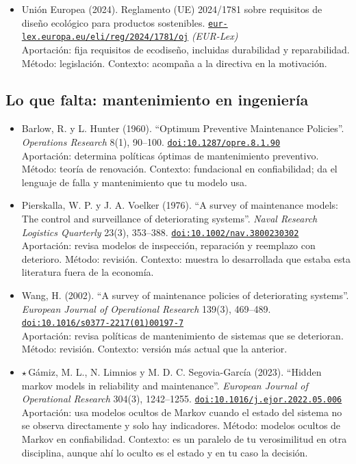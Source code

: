 \documentclass[11pt]{article}
\begin{document}
\begin{itemize}
Aportación: norma europea que promueve la reparación de bienes. Método: legislación. Contexto: motiva tu contrafactual de precio de reparación; cítala en la introducción.
\item Unión Europea (2024). Reglamento (UE) 2024/1781 sobre requisitos de diseño ecológico para productos sostenibles. \href{https://eur-lex.europa.eu/eli/reg/2024/1781/oj}{\texttt{eur-lex.europa.eu/eli/reg/2024/1781/oj}} \textit{(EUR-Lex)}\\
Aportación: fija requisitos de ecodiseño, incluidas durabilidad y reparabilidad. Método: legislación. Contexto: acompaña a la directiva en la motivación.
\end{itemize}

\subsection*{Lo que falta: mantenimiento en ingeniería}
\begin{itemize}
\item Barlow, R. y L. Hunter (1960). ``Optimum Preventive Maintenance Policies''. \textit{Operations Research} 8(1), 90--100. \href{https://doi.org/10.1287/opre.8.1.90}{\texttt{doi:10.1287/opre.8.1.90}}\\
Aportación: determina políticas óptimas de mantenimiento preventivo. Método: teoría de renovación. Contexto: fundacional en confiabilidad; da el lenguaje de falla y mantenimiento que tu modelo usa.
\item Pierskalla, W. P. y J. A. Voelker (1976). ``A survey of maintenance models: The control and surveillance of deteriorating systems''. \textit{Naval Research Logistics Quarterly} 23(3), 353--388. \href{https://doi.org/10.1002/nav.3800230302}{\texttt{doi:10.1002/nav.3800230302}}\\
Aportación: revisa modelos de inspección, reparación y reemplazo con deterioro. Método: revisión. Contexto: muestra lo desarrollada que estaba esta literatura fuera de la economía.
\item Wang, H. (2002). ``A survey of maintenance policies of deteriorating systems''. \textit{European Journal of Operational Research} 139(3), 469--489. \href{https://doi.org/10.1016/s0377-2217(01)00197-7}{\texttt{doi:10.1016/s0377-2217(01)00197-7}}\\
Aportación: revisa políticas de mantenimiento de sistemas que se deterioran. Método: revisión. Contexto: versión más actual que la anterior.
\item $\star$\,Gámiz, M. L., N. Limnios y M. D. C. Segovia-García (2023). ``Hidden markov models in reliability and maintenance''. \textit{European Journal of Operational Research} 304(3), 1242--1255. \href{https://doi.org/10.1016/j.ejor.2022.05.006}{\texttt{doi:10.1016/j.ejor.2022.05.006}}\\
Aportación: usa modelos ocultos de Markov cuando el estado del sistema no se observa directamente y solo hay indicadores. Método: modelos ocultos de Markov en confiabilidad. Contexto: es un paralelo de tu verosimilitud en otra disciplina, aunque ahí lo oculto es el estado y en tu caso la decisión.
\end{itemize}
\end{document}
